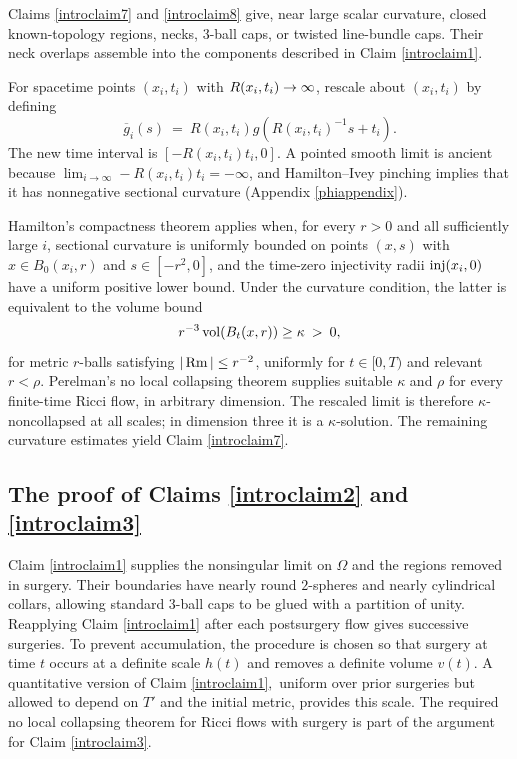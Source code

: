 Claims \ref{introclaim7} and \ref{introclaim8} give, near large scalar
curvature, closed known-topology regions, necks, $3$-ball caps, or twisted
line-bundle caps.  Their neck overlaps assemble into the components described
in Claim \ref{introclaim1}.

For spacetime points $(x_i,t_i)$ with $R(x_i,t_i)\rightarrow\infty$, rescale about
$(x_i,t_i)$ by defining
\begin{equation}
\overline{g}_i(s)\: =\:R(x_i,t_i)g\left(R(x_i,t_i)^{-1}s+t_i\right).
\end{equation}
The new time interval is $[-R(x_i,t_i)t_i,0]$.  A pointed smooth limit is
ancient because
$\lim_{i\rightarrow\infty}-R(x_i,t_i)t_i=-\infty$, and Hamilton--Ivey
pinching implies that it has nonnegative sectional curvature
(Appendix \ref{phiappendix}).

Hamilton's compactness theorem \cite{Hamiltonnn} applies when, for every
$r>0$ and all sufficiently large $i$, sectional curvature is uniformly
bounded on points $(x,s)$ with
$x\in B_0(x_i,r)$ and $s\in[-r^2,0]$, and the time-zero injectivity radii
$\operatorname{inj}(x_i,0)$ have a uniform positive lower bound.  Under the curvature
condition, the latter is equivalent to the volume bound
\begin{equation} \label{bound}
r^{-3}\operatorname{vol}(B_t(x,r))\geq\kappa\:>\:0,
\end{equation}
for metric $r$-balls satisfying $|\operatorname{Rm}|\leq r^{-2}$, uniformly for
$t\in[0,T)$ and relevant $r<\rho$.  Perelman's no local collapsing theorem
\cite{Perelman} supplies suitable $\kappa$ and $\rho$ for every finite-time
Ricci flow, in arbitrary dimension.  The rescaled limit is therefore
$\kappa$-noncollapsed at all scales; in dimension three it is a
$\kappa$-solution.  The remaining curvature estimates yield Claim
\ref{introclaim7}.

\subsection{The proof of Claims \ref{introclaim2} and \ref{introclaim3}}

Claim \ref{introclaim1} supplies the nonsingular limit on $\Omega$ and the
regions removed in surgery.  Their boundaries have nearly round $2$-spheres
and nearly cylindrical collars, allowing standard $3$-ball caps to be glued
with a partition of unity.  Reapplying Claim \ref{introclaim1} after each
postsurgery flow gives successive surgeries.  To prevent accumulation, the
procedure is chosen so that surgery at time $t$ occurs at a definite scale
$h(t)$ and removes a definite volume $v(t)$.  A quantitative version of Claim
\ref{introclaim1}$,$ uniform over prior surgeries but allowed to depend on
$T'$ and the initial metric, provides this scale.  The required no local
collapsing theorem for Ricci flows with surgery is part of the argument for
Claim \ref{introclaim3}.

